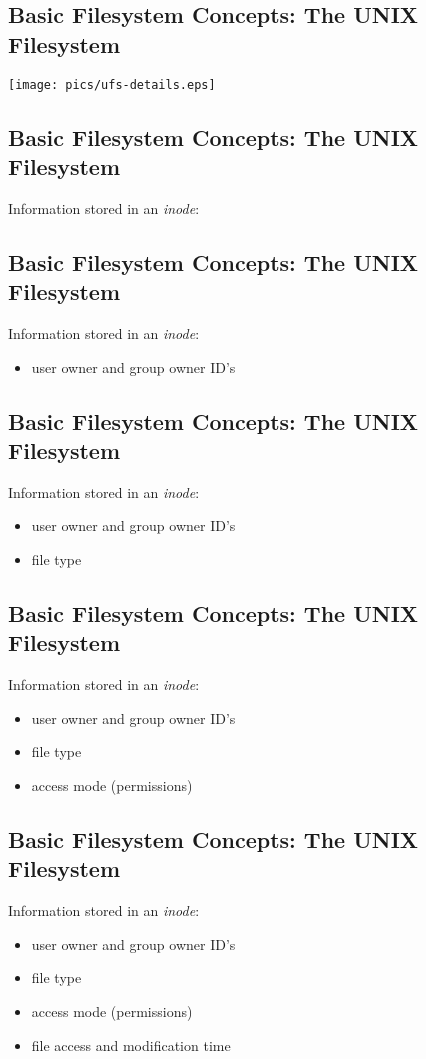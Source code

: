 \documentclass[xga]{xdvislides}
\begin{document}
\subsection{Basic Filesystem Concepts: The UNIX Filesystem}
\begin{center}
	\texttt{[image: pics/ufs-details.eps]} \\
\end{center}
\vspace*{\fill}

\subsection{Basic Filesystem Concepts: The UNIX Filesystem}
Information stored in an {\em inode}:

\subsection{Basic Filesystem Concepts: The UNIX Filesystem}
Information stored in an {\em inode}:
\begin{itemize}
	\item user owner and group owner ID's
\end{itemize}

\subsection{Basic Filesystem Concepts: The UNIX Filesystem}
Information stored in an {\em inode}:
\begin{itemize}
	\item user owner and group owner ID's
	\item file type
\end{itemize}

\subsection{Basic Filesystem Concepts: The UNIX Filesystem}
Information stored in an {\em inode}:
\begin{itemize}
	\item user owner and group owner ID's
	\item file type
	\item access mode (permissions)
\end{itemize}

\subsection{Basic Filesystem Concepts: The UNIX Filesystem}
Information stored in an {\em inode}:
\begin{itemize}
	\item user owner and group owner ID's
	\item file type
	\item access mode (permissions)
	\item file access and modification time
\end{itemize}
\end{document}
